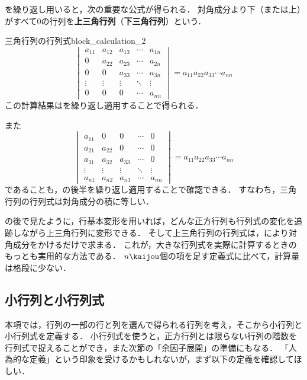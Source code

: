 を繰り返し用いると，次の重要な公式が得られる．
対角成分より下（または上）がすべて$0$の行列を\textbf{上三角行列}（\textbf{下三角行列}）という．

\begin{example}{三角行列の行列式}{block_calculation_2}
  \[
  \begin{vmatrix} 
    a_{11} & a_{12} & a_{13} & \cdots & a_{1n} \\
    0      & a_{22} & a_{23} & \cdots & a_{2n} \\
    0      & 0      & a_{33} & \cdots & a_{3n} \\
    \vdots & \vdots & \vdots & \ddots & \vdots \\
    0      & 0      & 0      & \cdots & a_{nn}
  \end{vmatrix}
  =
  a_{11}a_{22}a_{33}\cdots a_{nn}
  \]
  この計算結果はを繰り返し適用することで得られる．

  また
  \[
  \begin{vmatrix}
  a_{11} & 0     & 0      & \cdots & 0      \\
  a_{21} & a_{22} & 0      & \cdots & 0      \\
  a_{31} & a_{32} & a_{33} & \cdots & 0      \\
  \vdots & \vdots & \vdots & \ddots & \vdots \\
  a_{n1} & a_{n2} & a_{n3} & \cdots & a_{nn}
  \end{vmatrix}
  = a_{11}a_{22}a_{33}\cdots a_{nn}
  \]
  であることも，の後半を繰り返し適用することで確認できる．
  すなわち，三角行列の行列式は対角成分の積に等しい．
\end{example}

の後で見たように，行基本変形を用いれば，どんな正方行列も行列式の変化を追跡しながら上三角行列に変形できる．
そして上三角行列の行列式は，により対角成分をかけるだけで求まる．
これが，大きな行列式を実際に計算するときのもっとも実用的な方法である．
$n\kaijou$個の項を足す定義式に比べて，計算量は格段に少ない．

\subsection{小行列と小行列式}

本項では，行列の一部の行と列を選んで得られる行列を考え，そこから小行列と小行列式を定義する．
小行列式を使うと，正方行列とは限らない行列の階数を行列式で捉えることができ，また次節の「余因子展開」の準備にもなる．
「人為的な定義」という印象を受けるかもしれないが，まず以下の定義を確認してほしい．

